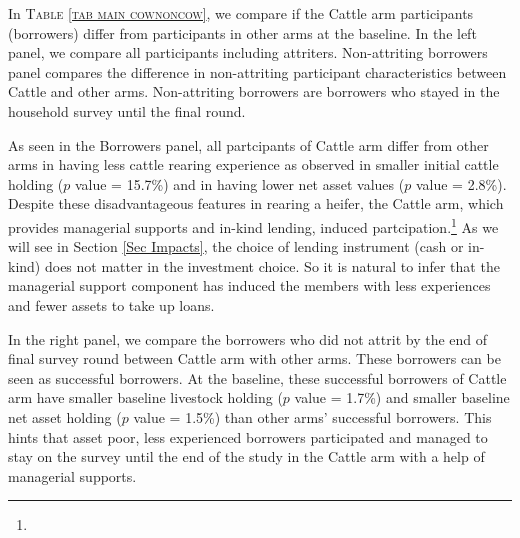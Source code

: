 	In \textsc{\small Table \ref{tab main cownoncow}}, we compare if the \textsf{Cattle} arm participants (borrowers) differ from participants in other arms at the baseline. In the left panel, we compare all participants including attriters. \textsf{Non-attriting borrowers} panel compares the difference in non-attriting participant characteristics between \textsf{Cattle} and other arms. Non-attriting borrowers are borrowers who stayed in the household survey until the final round. 
	
	As seen in the Borrowers panel, all partcipants of \textsf{Cattle} arm differ from other arms in having less cattle rearing experience as observed in smaller initial cattle holding ($p$ value = 15.7\%) and in having lower net asset values ($p$ value = 2.8\%). Despite these disadvantageous features in rearing a heifer, the \textsf{Cattle} arm, which provides managerial supports and in-kind lending, induced partcipation.\footnote{ } As we will see in Section \ref{Sec Impacts}, the choice of lending instrument (cash or in-kind) does not matter in the investment choice. So it is natural to infer that the managerial support component has induced the members with less experiences and fewer assets to take up loans. 

	In the right panel, we compare the borrowers who did not attrit by the end of final survey round between \textsf{Cattle} arm with other arms. These borrowers can be seen as successful borrowers. At the baseline, these successful borrowers of \textsf{Cattle} arm have smaller baseline livestock holding ($p$ value = 1.7\%) and smaller baseline net asset holding ($p$ value = 1.5\%) than other arms' successful borrowers. %
This hints that asset poor, less experienced borrowers participated and managed to stay on the survey until the end of the study in the \textsf{Cattle} arm with a help of managerial supports.  

